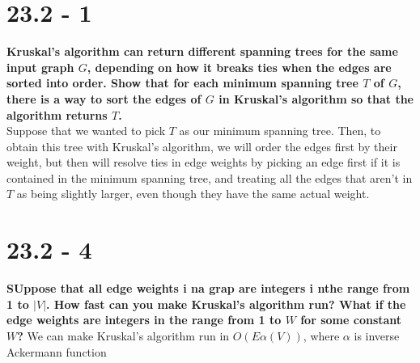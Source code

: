 \documentclass{report}
\begin{document}
\section*{23.2 - 1}
\textbf{Kruskal's algorithm can return different spanning trees for the same input graph $G$, depending on how it breaks ties when the edges are sorted into order. Show that for each minimum spanning tree $T$ of $G$, there is a way to sort the edges of $G$ in Kruskal's algorithm so that the algorithm returns $T$.} \\
Suppose that we wanted to pick $T$ as our minimum spanning tree. Then, to obtain this tree with Kruskal's algorithm, we will order the edges first by their weight, but then will resolve ties in edge weights by picking an edge first if it is contained in the minimum spanning tree, and treating all the edges that aren't in $T$ as being slightly larger, even though they have the same actual weight.

\section*{23.2 - 4}
\textbf{SUppose that all edge weights i na grap are integers i nthe range from 1 to $|V|$. How fast can you make Kruskal's algorithm run? What if the edge weights are integers in the range from 1 to $W$ for some constant $W$?}
We can make Kruskal's algorithm run in $O(E \alpha(V))$, where $\alpha$ is inverse Ackermann function

\section*{}
\end{document}
